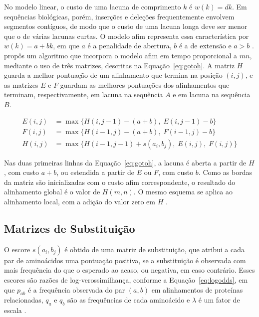 No modelo linear, o custo de uma lacuna de comprimento $k$ é $w(k) = dk$. Em sequências biológicas, porém, inserções e deleções frequentemente envolvem segmentos contíguos, de modo que o custo de uma lacuna longa deve ser menor que o de várias lacunas curtas. O modelo afim representa essa característica por $w(k) = a + bk$, em que $a$ é a penalidade de abertura, $b$ é a de extensão e $a > b$ \cite{Durbin1998}.  propôs um algoritmo que incorpora o modelo afim em tempo proporcional a $mn$, mediante o uso de três matrizes, descritas na Equação~\ref{eq:gotoh}. A matriz $H$ guarda a melhor pontuação de um alinhamento que termina na posição $(i,j)$, e as matrizes $E$ e $F$ guardam as melhores pontuações dos alinhamentos que terminam, respectivamente, em lacuna na sequência $A$ e em lacuna na sequência $B$.

\begin{equation}
	\begin{aligned}
		E(i,j) &= \max\{ H(i,j-1) - (a+b),\; E(i,j-1) - b \} \\
		F(i,j) &= \max\{ H(i-1,j) - (a+b),\; F(i-1,j) - b \} \\
		H(i,j) &= \max\{ H(i-1,j-1) + s(a_i, b_j),\; E(i,j),\; F(i,j) \}
	\end{aligned}
	\label{eq:gotoh}
\end{equation}

Nas duas primeiras linhas da Equação~\ref{eq:gotoh}, a lacuna é aberta a partir de $H$, com custo $a+b$, ou estendida a partir de $E$ ou $F$, com custo $b$. Como as bordas da matriz são inicializadas com o custo afim correspondente, o resultado do alinhamento global é o valor de $H(m,n)$. O mesmo esquema se aplica ao alinhamento local, com a adição do valor zero em $H$ \cite{Gotoh1982}.

\subsection{Matrizes de Substituição}

O escore $s(a_i, b_j)$ é obtido de uma matriz de substituição, que atribui a cada par de aminoácidos uma pontuação positiva, se a substituição é observada com mais frequência do que o esperado ao acaso, ou negativa, em caso contrário. Esses escores são razões de log-verossimilhança, conforme a Equação~\ref{eq:logodds}, em que $p_{ab}$ é a frequência observada do par $(a,b)$ em alinhamentos de proteínas relacionadas, $q_a$ e $q_b$ são as frequências de cada aminoácido e $\lambda$ é um fator de escala \cite{Henikoff1992}.

